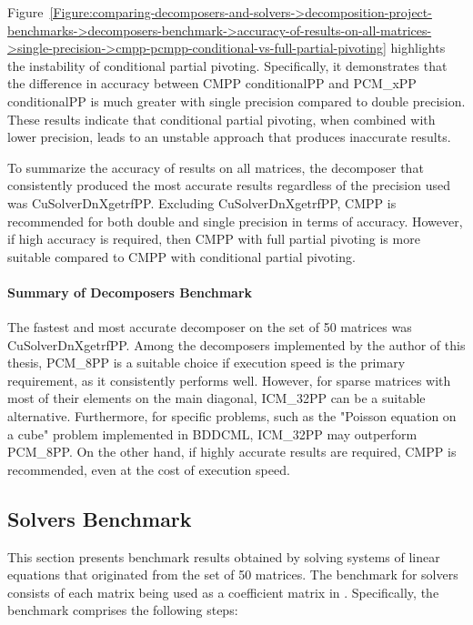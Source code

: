 Figure~\ref{Figure:comparing-decomposers-and-solvers->decomposition-project-benchmarks->decomposers-benchmark->accuracy-of-results-on-all-matrices->single-precision->cmpp-pcmpp-conditional-vs-full-partial-pivoting} highlights the instability of conditional partial pivoting.
Specifically, it demonstrates that the difference in accuracy between CMPP conditionalPP and PCM\_xPP conditionalPP is much greater with single precision compared to double precision.
These results indicate that conditional partial pivoting, when combined with lower precision, leads to an unstable approach that produces inaccurate results.

To summarize the accuracy of results on all matrices, the decomposer that consistently produced the most accurate results regardless of the precision used was CuSolverDnXgetrfPP.
Excluding CuSolverDnXgetrfPP, CMPP is recommended for both double and single precision in terms of accuracy.
However, if high accuracy is required, then CMPP with full partial pivoting is more suitable compared to CMPP with conditional partial pivoting.

\paragraph{Summary of Decomposers Benchmark} The fastest and most accurate decomposer on the set of 50 matrices was CuSolverDnXgetrfPP.
Among the decomposers implemented by the author of this thesis, PCM\_8PP is a suitable choice if execution speed is the primary requirement, as it consistently performs well.
However, for sparse matrices with most of their elements on the main diagonal, ICM\_32PP can be a suitable alternative.
Furthermore, for specific problems, such as the "Poisson equation on a cube" problem implemented in BDDCML, ICM\_32PP may outperform PCM\_8PP.
On the other hand, if highly accurate results are required, CMPP is recommended, even at the cost of execution speed.



\subsection{Solvers Benchmark}\label{Subsection:comparing-decomposers-and-solvers->decomposition-project-benchmarks->solvers-benchmark}
This section presents benchmark results obtained by solving systems of linear equations that originated from the set of 50 matrices.
The benchmark for solvers consists of each matrix being used as a coefficient matrix  in .
Specifically, the benchmark comprises the following steps:

